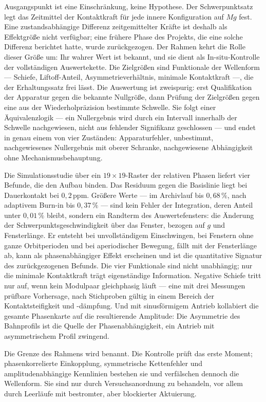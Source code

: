\documentclass[12pt,a4paper]{report}
\begin{document}
Ausgangspunkt ist eine Einschränkung, keine Hypothese. Der
Schwerpunktsatz legt das Zeitmittel der Kontaktkraft für jede innere
Konfiguration auf $Mg$ fest. Eine zustandsabhängige Differenz
zeitgemittelter Kräfte ist deshalb als Effektgröße nicht verfügbar; eine
frühere Phase des Projekts, die eine solche Differenz berichtet hatte,
wurde zurückgezogen. Der Rahmen kehrt die Rolle dieser Größe um: Ihr
wahrer Wert ist bekannt, und sie dient als In-situ-Kontrolle der
vollständigen Auswertekette. Die Zielgrößen sind Funktionale der
Wellenform --- Schiefe, Liftoff-Anteil, Asymmetrieverhältnis, minimale
Kontaktkraft ---, die der Erhaltungssatz frei lässt. Die Auswertung ist
zweispurig: erst Qualifikation der Apparatur gegen die bekannte
Nullgröße, dann Prüfung der Zielgrößen gegen eine aus der
Wiederholpräzision bestimmte Schwelle. Sie folgt einer Äquivalenzlogik --- ein
Nullergebnis wird durch ein Intervall innerhalb der Schwelle
nachgewiesen, nicht aus fehlender Signifikanz geschlossen --- und endet
in genau einem von vier Zuständen: Apparaturfehler, unbestimmt,
nachgewiesenes Nullergebnis mit oberer Schranke, nachgewiesene
Abhängigkeit ohne Mechanismusbehauptung.

Die Simulationsstudie über ein $19\times19$-Raster der relativen Phasen
liefert vier Befunde, die den Aufbau binden. Das Residuum gegen die
Basislinie liegt bei Dauerkontakt bei $0{,}2\,\mathrm{ppm}$. Größere Werte
--- im Archivlauf bis $0{,}68\,\%$, nach adaptivem Burn-in bis
$0{,}37\,\%$ --- sind kein Fehler der Integration, deren Anteil unter
$0{,}01\,\%$ bleibt, sondern ein Randterm des Auswertefensters: die
Änderung der Schwerpunktsgeschwindigkeit über das Fenster, bezogen auf
$g$ und Fensterlänge. Er entsteht bei unvollständigem Einschwingen, bei
Fenstern ohne ganze Orbitperioden und bei aperiodischer Bewegung, fällt
mit der Fensterlänge ab, kann als phasenabhängiger Effekt erscheinen und
ist die quantitative Signatur des zurückgezogenen Befunds. Die vier
Funktionale sind nicht unabhängig; nur die minimale Kontaktkraft trägt
eigenständige Information. Negative Schiefe tritt nur auf, wenn kein
Modulpaar gleichphasig läuft --- eine mit drei Messungen prüfbare
Vorhersage, nach Stichproben gültig in einem Bereich der
Kontaktsteifigkeit und -dämpfung. Und mit sinusförmigem Antrieb kollabiert die gesamte
Phasenkarte auf die resultierende Amplitude: Die Asymmetrie des
Bahnprofils ist die Quelle der Phasenabhängigkeit, ein Antrieb mit
asymmetrischem Profil zwingend.

Die Grenze des Rahmens wird benannt. Die Kontrolle prüft das erste
Moment; phasenkorrelierte Einkopplung, symmetrische Kettenfehler und
amplitudenabhängige Kennlinien bestehen sie und verfälschen dennoch die
Wellenform. Sie sind nur durch Versuchsanordnung zu behandeln, vor allem
durch Leerläufe mit bestromter, aber blockierter Aktuierung.
\end{document}
